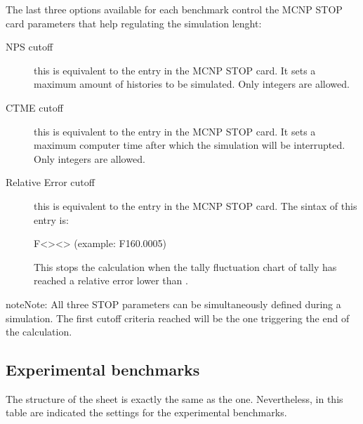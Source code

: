 \documentclass[letterpaper,10pt,english]{sphinxmanual}
\let\sphinxpxdimen\pdfpxdimen\else\newdimen\sphinxpxdimen
\begin{document}
The last three options available for each benchmark control the MCNP STOP card parameters
that help regulating the simulation lenght:
\begin{description}
\item[{NPS cut\sphinxhyphen{}off}] \leavevmode
this is equivalent to the  entry in the MCNP STOP card. It sets a maximum amount
of histories to be simulated. Only integers are allowed.

\item[{CTME cut\sphinxhyphen{}off}] \leavevmode
this is equivalent to the  entry in the MCNP STOP card. It sets a maximum computer
time after which the simulation will be interrupted. Only integers are allowed.

\item[{Relative Error cut\sphinxhyphen{}off}] \leavevmode
this is equivalent to the  entry in the MCNP STOP card. The sintax of this entry is:

F\textless{}\textgreater{}\sphinxhyphen{}\textless{}\textgreater{}  (example: F16\sphinxhyphen{}0.0005)

This stops the calculation when the tally fluctuation chart of tally  has reached a
relative error lower than .

\end{description}

\begin{sphinxadmonition}{note}{Note:}
All three STOP parameters can be simultaneously defined during a simulation. The first
cut\sphinxhyphen{}off criteria reached will be the one triggering the end of the calculation.
\end{sphinxadmonition}


\subsection{Experimental benchmarks}
\label{\detokenize{usage/configuration:experimental-benchmarks}}
\noindent\sphinxincludegraphics[width=600\sphinxpxdimen]{{exp}.png}

The structure of the sheet is exactly the same as the {\hyperref[\detokenize{usage/configuration:compsheet}]{}} one. Nevertheless,
in this table are indicated the settings for the experimental benchmarks.
\end{document}
